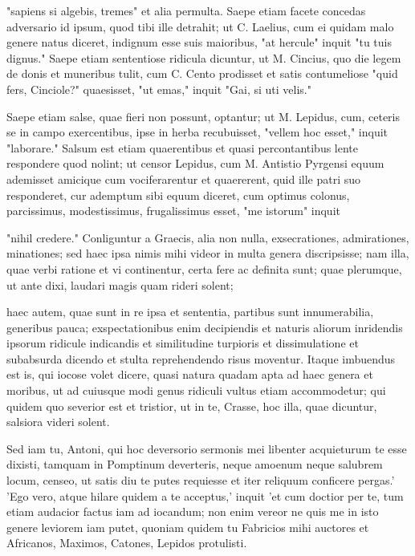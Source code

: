  "sapiens si algebis, tremes" et alia permulta. Saepe etiam facete concedas adversario id ipsum, quod tibi ille detrahit; ut C. Laelius, cum ei quidam malo genere natus diceret, indignum esse suis maioribus, "at hercule" inquit "tu tuis dignus." Saepe etiam sententiose ridicula dicuntur, ut M. Cincius, quo die legem de donis et muneribus tulit, cum C. Cento prodisset et satis contumeliose "quid fers, Cinciole?" quaesisset, "ut emas," inquit "Gai, si uti velis."

 Saepe etiam salse, quae fieri non possunt, optantur; ut M. Lepidus, cum, ceteris se in campo exercentibus, ipse in herba recubuisset, "vellem hoc esset," inquit "laborare." Salsum est etiam quaerentibus et quasi percontantibus lente respondere quod nolint; ut censor Lepidus, cum M. Antistio Pyrgensi equum ademisset amicique cum vociferarentur et quaererent, quid ille patri suo responderet, cur ademptum sibi equum diceret, cum optimus colonus, parcissimus, modestissimus, frugalissimus esset, "me istorum" inquit

 "nihil credere." Conliguntur a Graecis, alia non nulla, exsecrationes, admirationes, minationes; sed haec ipsa nimis mihi videor in multa genera discripsisse; nam illa, quae verbi ratione et vi continentur, certa fere ac definita sunt; quae plerumque, ut ante dixi, laudari magis quam rideri solent;

 haec autem, quae sunt in re ipsa et sententia, partibus sunt innumerabilia, generibus pauca; exspectationibus enim decipiendis et naturis aliorum inridendis ipsorum ridicule indicandis et similitudine turpioris et dissimulatione et subabsurda dicendo et stulta reprehendendo risus moventur. Itaque imbuendus est is, qui iocose volet dicere, quasi natura quadam apta ad haec genera et moribus, ut ad cuiusque modi genus ridiculi vultus etiam accommodetur; qui quidem quo severior est et tristior, ut in te, Crasse, hoc illa, quae dicuntur, salsiora videri solent.

 Sed iam tu, Antoni, qui hoc deversorio sermonis mei libenter acquieturum te esse dixisti, tamquam in Pomptinum deverteris, neque amoenum neque salubrem locum, censeo, ut satis diu te putes requiesse et iter reliquum conficere pergas.' 'Ego vero, atque hilare quidem a te acceptus,' inquit 'et cum doctior per te, tum etiam audacior factus iam ad iocandum; non enim vereor ne quis me in isto genere leviorem iam putet, quoniam quidem tu Fabricios mihi auctores et Africanos, Maximos, Catones, Lepidos protulisti.

